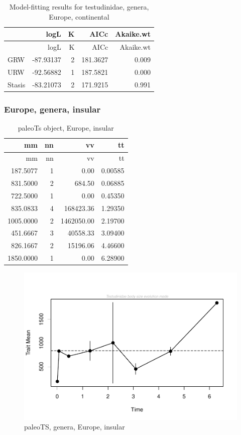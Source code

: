 \begin{longtable}[]{@{}lrrrr@{}}
	\caption{Model-fitting results for testudinidae, genera, Europe,
		continental}
	\label{tab:pTSEuCEM}\tabularnewline
	\toprule
	& logL & K & AICc & Akaike.wt\tabularnewline
	\midrule
	\endfirsthead
	\toprule
	& logL & K & AICc & Akaike.wt\tabularnewline
	\midrule
	\endhead
	GRW & -87.93137 & 2 & 181.3627 & 0.009\tabularnewline
	URW & -92.56882 & 1 & 187.5821 & 0.000\tabularnewline
	Stasis & -83.21073 & 2 & 171.9215 & 0.991\tabularnewline
	\bottomrule
\end{longtable}


\FloatBarrier



\subsubsection*{Europe, genera,
	insular}\label{europe-genera-insular}

\begin{longtable}[]{@{}rrrr@{}}
	\caption{paleoTs object, Europe, insular}
	\label{tab:pTSEuI}\tabularnewline
	\toprule
	mm & nn & vv & tt\tabularnewline
	\midrule
	\endfirsthead
	\toprule
	mm & nn & vv & tt\tabularnewline
	\midrule
	\endhead
	187.5077 & 1 & 0.00 & 0.00585\tabularnewline
	831.5000 & 2 & 684.50 & 0.06885\tabularnewline
	722.5000 & 1 & 0.00 & 0.45350\tabularnewline
	835.0833 & 4 & 168423.36 & 1.29350\tabularnewline
	1005.0000 & 2 & 1462050.00 & 2.19700\tabularnewline
	451.6667 & 3 & 40558.33 & 3.09400\tabularnewline
	826.1667 & 2 & 15196.06 & 4.46600\tabularnewline
	1850.0000 & 1 & 0.00 & 6.28900\tabularnewline
	\bottomrule
\end{longtable}

\begin{figure}[H]
	\centering
	\includegraphics{MA_JJ_files/figure-latex/pTSEuI-1.pdf}
	\caption{paleoTS, genera, Europe, insular}
	\label{fig:pTSEuI}
\end{figure}

